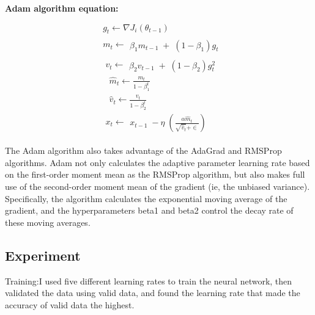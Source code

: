 \documentclass{article}
\begin{document}
\textbf{Adam algorithm equation:}
\begin{equation}\label{adam}
\begin{aligned}
\begin{array}{l}\begin{array}{l}\begin{array}{l}\begin{array}{l}g_t\leftarrow\nabla J_i\left(\theta_{t-1}\right)\end{array}\\\begin{array}{l}m_t\leftarrow\end{array}\beta_1m_{t-1}\;+\;\left(1-\beta_1\right)g_t\end{array}\end{array}\\\begin{array}{l}\;\;\;\;v_t\leftarrow\end{array}\beta_2v_{t-1}\;+\;\left(1-\beta_2\right)g_t^2\\\;\;\;\;\;\;\;{\widehat m}_t\leftarrow\frac{m_t}{1-\beta_1^t}\\\;\;\;\;\;\;\;{\widehat v}_t\leftarrow\frac{v_t}{1-\beta_2^t}\\\;\;\;\;\begin{array}{l}x_t\leftarrow\end{array}x_{t-1}\;-\eta\;\left(\frac{\alpha{\widehat m}_t}{\sqrt{{\widehat v}_t}+\in}\right)\end{array}
\end{aligned}
\end{equation}

The Adam algorithm also takes advantage of the AdaGrad and RMSProp algorithms. Adam not only calculates the adaptive parameter learning rate based on the first-order moment mean as the RMSProp algorithm, but also makes full use of the second-order moment mean of the gradient (ie, the unbiased variance). Specifically, the algorithm calculates the exponential moving average of the gradient, and the hyperparameters beta1 and beta2 control the decay rate of these moving averages.

\subsection{Experiment}

Training:I used five different learning rates to train the neural network, then validated the data using valid data, and found the learning rate that made the accuracy of valid data the highest.
\end{document}
